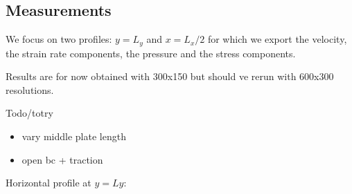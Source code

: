 \subsection*{Measurements}
We focus on two profiles: $y=L_y$ and $x=L_x/2$ for which we export the velocity, 
the strain rate components, the pressure and the stress components.

Results are for now obtained with 300x150 but should ve rerun with 600x300 resolutions.

Todo/totry
\begin{itemize}
\item vary middle plate length
\item open bc + traction
\end{itemize}

\newpage

Horizontal profile at $y=Ly$:

